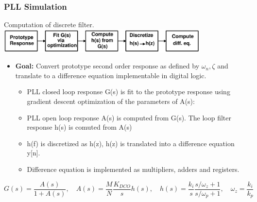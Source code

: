 \documentclass[t, screen, aspectratio=43]{beamer}
\begin{document}
\begin{frame}
	\frametitle{PLL Simulation}
	\begin{block}{Computation of discrete filter.}
		\center\includegraphics[width=0.8\textwidth, angle=0]{filter_coef_algorithm.pdf}
		\begin{itemize}
			\scriptsize
				\item \textbf{Goal:} Convert prototype second order response as defined by $\omega_n,\zeta$ and translate to a difference equation implementable in digital logic.
				\begin{itemize}
				\scriptsize
				\item PLL closed loop response G(s) is fit to the prototype response using gradient descent optimization of the parameters of A(s):
				\item PLL open loop response A(s) is computed from G(s). The loop filter response h(s) is comuted from A(s)
				\item h(f) is discretized as h(z), h(z) is translated into a difference equation y[n].
				\item Difference equation is implemented as multipliers, adders and registers.
			\end{itemize}
		\end{itemize} 	
		\scriptsize
		\begin{equation}
			G(s) = \frac{A(s)}{1+A(s)}, \hspace{1em} A(s) = \frac{M}{N}\frac{K_{DCO}}{s}h(s), \hspace{1em}h(s) = \frac{k_i}{s}\frac{s/\omega_z + 1}{s/\omega_p + 1}, \hspace{1em}\omega_z = \frac{k_i}{k_p}
		\end{equation}
	\end{block}
\end{frame}
\end{document}
